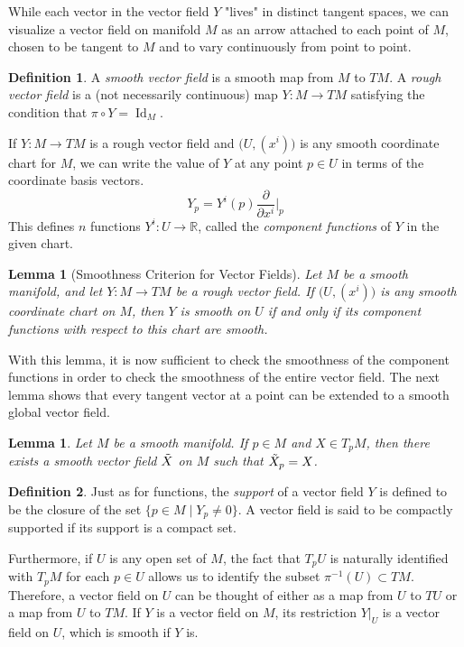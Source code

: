 \documentclass{article}
\DeclareMathOperator{\Id}{Id}
\newtheorem{lemma}[theorem]{Lemma}
\theoremstyle{remark}
\theoremstyle{definition}
\newtheorem{definition}{Definition}[section]
\begin{document}
While each vector in the vector field $Y$ "lives" in distinct tangent spaces, we can visualize a vector field on manifold $M$ as an arrow attached to each point of $M$, chosen to be tangent to $M$ and to vary continuously from point to point. 

\begin{definition}
A \textit{smooth vector field} is a smooth map from $M$ to $TM$. A \textit{rough vector field} is a (not necessarily continuous) map $Y: M \longrightarrow TM$ satisfying the condition that $\pi\circ Y = \Id_M$. 
\end{definition}

If $Y: M \longrightarrow TM$ is a rough vector field and $\big( U, (x^i)\big)$ is any smooth coordinate chart for $M$, we can write the value of $Y$ at any point $p \in U$ in terms of the coordinate basis vectors. 
\[Y_p = Y^i (p) \frac{\partial}{\partial x^i} \bigg|_p\]
This defines $n$ functions $Y^i: U \longrightarrow \mathbb{R}$, called the \textit{component functions} of $Y$ in the given chart. 

\begin{lemma}[Smoothness Criterion for Vector Fields]
Let $M$ be a smooth manifold, and let $Y: M \longrightarrow TM$ be a rough vector field. If $\big( U, (x^i)\big)$ is any smooth coordinate chart on $M$, then $Y$ is smooth on $U$ if and only if its component functions with respect to this chart are smooth. 
\end{lemma}

With this lemma, it is now sufficient to check the smoothness of the component functions in order to check the smoothness of the entire vector field. The next lemma shows that every tangent vector at a point can be extended to a smooth global vector field. 

\begin{lemma}
Let $M$ be a smooth manifold. If $p \in M$ and $X \in T_p M$, then there exists a smooth vector field $\Tilde{X}$ on $M$ such that $\Tilde{X}_p = X$. 
\end{lemma}

\begin{definition}
Just as for functions, the \textit{support} of a vector field $Y$ is defined to be the closure of the set $\{ p \in M\;|\; Y_p \neq 0\}$. A vector field is said to be compactly supported if its support is a compact set. 
\end{definition}

Furthermore, if $U$ is any open set of $M$, the fact that $T_p U$ is naturally identified with $T_p M$ for each $p \in U$ allows us to identify the subset $\pi^{-1} (U) \subset TM$. Therefore, a vector field on $U$ can be thought of either as a map from $U$ to $TU$ or a map from $U$ to $TM$. If $Y$ is a vector field on $M$, its restriction $Y |_U$ is a vector field on $U$, which is smooth if $Y$ is. 
\end{document}
